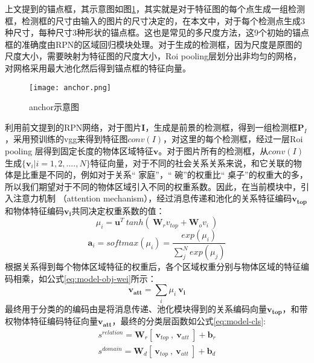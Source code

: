 上文提到的锚点框，其示意图如图\ref{fig:anchor}，其实就是对于特征图的每个点生成一组检测框，检测框的尺寸由输入的图片的尺寸决定的，在本文中，对于每个检测点生成3种尺寸，每种尺寸3种形状的锚点框。这也是常见的多尺度方法，这9个初始的锚点框的准确度由RPN的区域回归模块处理。对于生成的检测框，因为尺度是原图的尺度大小，需要映射为特征图的尺度大小，Roi pooling层划分出非均匀的网格，对网格采用最大池化然后得到锚点框的特征向量。
\begin{figure}[htpb]
	\centering
	\texttt{[image: anchor.png]}
    \caption{anchor示意图}
	\vspace*{-3.5mm}
	\label{fig:anchor}
\end{figure}

利用前文提到的RPN网络，对于图片$\bm{I}$，生成是前景的检测框，得到一组检测框$\bm{P}_{I}$，采用预训练的vgg来得到特征图$conv(I)$，对这里的每个检测框，经过一层Roi pooling 层得到固定长度的物体区域特征$\mathbf{v}$。对于图片所有的检测框，从$conv(I)$生成$\{ \mathbf{v}_{i}|i=1,2,....,N\}$特征向量，对于不同的社会关系关系来说，和它关联的物体是比重是不同的，例如对于关系`` 家庭''，`` 碗''的权重比`` 桌子''的权重大的多，所以我们期望对于不同的物体区域引入不同的权重系数。因此，在当前模块中，引入注意力机制
（attention mechanism），经过消息传递和池化的关系特征编码$\mathbf{v_{top}}$和物体特征编码$\mathbf{v_{i}}$共同决定权重系数的值：
\begin{equation}
    \mu_{i} = \mathbf{u}^{T}~tanh(~\mathbf{W}_{r}v_{top}+\mathbf{W}_{o}v_{i}~)
\end{equation}
\begin{equation}
    \mathbf{a}_{i} = softmax(\mu_i) = \frac{exp(\mu_{i})}{\sum_{j}^{N}exp(\mu_{j})}
\end{equation}
根据关系得到每个物体区域特征的权重后，各个区域权重分别与物体区域的特征编码相乘，如公式\ref{eq:model-obj-wei}所示：
\begin{equation}
    \label{eq:model-obj-wei}
    \mathbf{v_{att}} = \sum_{i}\mu_{i}~\mathbf{v_{i}}
\end{equation}
最终用于分类的的编码由是将消息传递、池化模块得到的关系编码向量$\mathbf{v_{top}}$，和带权物体特征编码特征向量$\mathbf{v_{att}}$，最终的分类层函数如公式\ref{eq:model-cls}:
\begin{equation}
    \label{eq:model-cls}
    \begin{split}
    s^{relation} = \mathbf{W}_{r}[~\mathbf{v}_{top}~,~\mathbf{v}_{att}~] + \mathbf{b}_r \\
    s^{domain} = \mathbf{W}_{d}[~\mathbf{v}_{top}~,~\mathbf{v}_{att}~] + \mathbf{b}_d
    \end{split}
\end{equation}


